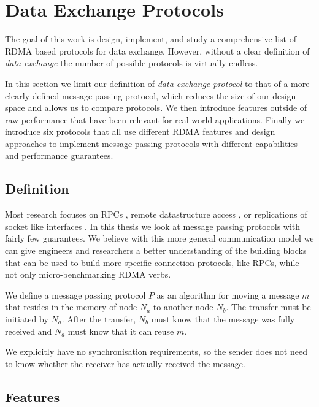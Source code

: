 \section{Data Exchange Protocols}\label{sec:protocols}
The goal of this work is design, implement, and study a comprehensive list of RDMA based protocols for data exchange. 
However, without a clear definition of \emph{data exchange} the number of possible protocols is virtually endless.

In this section we limit our definition of \emph{data exchange protocol} to that of a more clearly defined message passing
protocol, which reduces the size of our design space and allows us to compare protocols. We then introduce
features outside of raw performance that have been relevant for real-world applications. Finally we introduce six 
protocols that all use different RDMA features and design approaches to implement message passing protocols with different 
capabilities and performance guarantees.

\subsection{Definition}\label{sec:proto-def}

Most research focuses on RPCs \cite{anuj-guide, fasst, herd}, remote datastructure access \cite{pilaf, farm}, or replications of
socket like interfaces \cite{socksdirect}. In this thesis we look at message passing protocols with fairly few guarantees.
We believe with this more general communication model we can give engineers and researchers a better understanding of the 
building blocks that can be  used to build more specific connection protocols, like RPCs, while not only 
micro-benchmarking RDMA verbs.


\begin{defn}
We define a message passing protocol $P$ as an algorithm for moving a message $m$ that resides in the memory of
node $N_a$ to another node $N_b$. The transfer must be initiated by $N_a$. After the transfer, $N_b$ must know that the 
message was fully received and $N_a$ must know that it can reuse $m$.
\end{defn}

We explicitly have no synchronisation requirements, so the sender does not need to know whether the receiver has actually 
received the message.



\pagebreak

\subsection{Features} \label{sec:features} 


